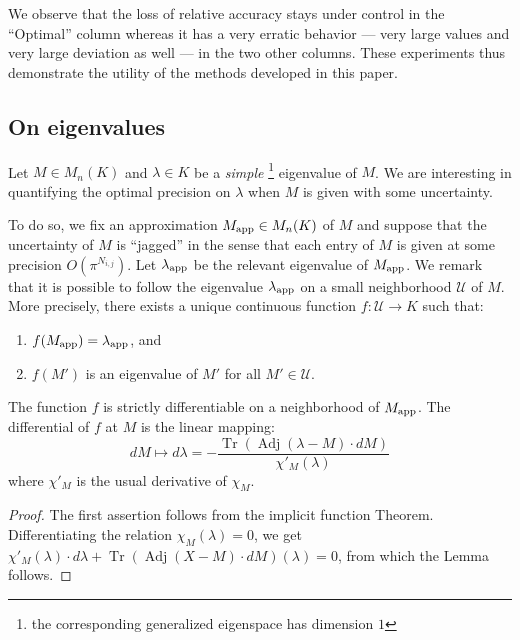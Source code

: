 \documentclass{sig-alternate-05-2015}
\DeclareMathOperator{\tr}{Tr}
\DeclareMathOperator{\adj}{Adj}
\newcommand{\calU}{\mathcal{U}}
\newcommand{\app}{\text{\rm app}}
\begin{document}
We observe that the loss of relative accuracy stays under control in the 
``Optimal'' column whereas it has a very erratic behavior --- very large 
values and very large deviation as well --- in the two other columns. 
These experiments thus demonstrate the utility of the methods developed
in this paper.

\subsection{On eigenvalues}
\label{ssec:eigenvalues}

Let $M \in M_n(K)$ and $\lambda \in K$ be a \emph{simple}
\footnote{the corresponding generalized eigenspace has dimension $1$} eigenvalue 
of $M$. We are interesting in quantifying the optimal precision on 
$\lambda$ when $M$ is given with some uncertainty.

To do so, we fix an approximation $M_\app \in M_n(K)$ of $M$ and 
suppose that the uncertainty of $M$ is ``jagged'' in the sense that
each entry of $M$ is given at some precision $O(\pi^{N_{i,j}})$.
Let $\lambda_\app$ be the relevant eigenvalue of $M_\app$. We remark 
that it is possible to follow the eigenvalue $\lambda_\app$ on a small 
neighborhood $\calU$ of $M$. More precisely, there exists a unique continuous 
function $f : \calU \to K$ such that:
\begin{enumerate}[$\bullet$]
\renewcommand{\itemsep}{0pt}
\item $f(M_\app) = \lambda_\app$, and
\item $f(M')$ is an eigenvalue of $M'$ for all $M' \in \calU$.
\end{enumerate}

\begin{lem}
The function $f$ is strictly differentiable on a neighborhood of 
$M_\app$.
The differential of $f$ at $M$ is the linear mapping:
$$dM \mapsto d \lambda = - \frac{\tr(\adj(\lambda-M) \cdot dM)}
{\chi'_M(\lambda)}$$
where $\chi'_M$ is the usual derivative of $\chi_M$.
\end{lem}

\begin{proof}
The first assertion follows from the implicit function Theorem.
Differentiating the relation $\chi_M(\lambda) = 0$, we get
$\chi'_M(\lambda) \cdot d \lambda + \tr(\adj(X-M) \cdot dM)(\lambda) = 0$,
from which the Lemma follows.
\end{proof}
\end{document}

